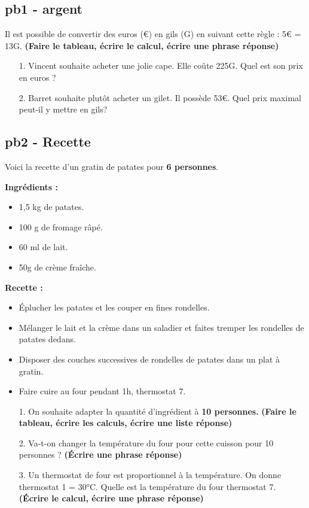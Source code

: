 \subsection*{pb1 - argent}
Il est possible de convertir des euros (€) en gils (G) en suivant cette règle : 5€ = 13G.
\textbf{(Faire le tableau, écrire le calcul, écrire une phrase réponse)}

\begin{enumerate}
  \item[1.] Vincent souhaite acheter une jolie cape. Elle coûte 225G. Quel est son prix en euros ? 
  \item[2.] Barret souhaite plutôt acheter un gilet. Il possède 53€. Quel prix maximal peut-il y mettre en gils?
\end{enumerate}

\subsection*{pb2 - Recette}
Voici la recette d'un gratin de patates pour \textbf{6 personnes}. 

\begin{minipage}[t]{0.45\textwidth}
  \textbf{Ingrédients : }
  \begin{itemize}
    \item 1,5 kg de patates.
    \item 100 g de fromage râpé.
    \item 60 ml de lait.
    \item 50g de crème fraîche.
  \end{itemize}

\end{minipage}
\begin{minipage}[t]{0.5\textwidth}
  \textbf{Recette :}
  \begin{itemize}
    \item Éplucher les patates et les couper en fines rondelles.
    \item Mélanger le lait et la crème dans un saladier et faites tremper les rondelles de patates dedans.
    \item Disposer des couches successives de rondelles de patates dans un plat à gratin. 
    \item Faire cuire au four pendant 1h, thermostat 7.
  \end{itemize}
\end{minipage}

\begin{enumerate}
  \item[1.] On souhaite adapter la quantité d'ingrédient à \textbf{10 personnes.} \textbf{(Faire le tableau, écrire les calculs, écrire une liste réponse)}
  \item[2.] Va-t-on changer la température du four pour cette cuisson pour 10 personnes ?  \textbf{(Écrire une phrase réponse)}
  \item[3.] Un thermostat de four est proportionnel à la température. On donne thermostat 1 = 30°C. Quelle est la température du four thermostat 7. \textbf{(Écrire le calcul, écrire une phrase réponse)} 
\end{enumerate}

